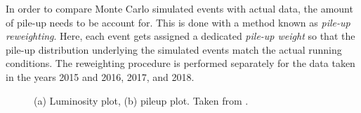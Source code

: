 In order to compare Monte Carlo simulated events with actual data, the amount of pile-up needs to be account for. This is done with a method known as \emph{pile-up reweighting}. Here, each event gets assigned a dedicated \emph{pile-up weight} so that the pile-up distribution underlying the simulated events match the actual running conditions. The reweighting procedure is performed separately for the data taken in the years 2015 and 2016, 2017, and 2018. 



\begin{figure}
    \caption{(a) Luminosity plot, (b) pileup plot. Taken from .}
    \label{fig:run-2-data-taking}
\end{figure}
